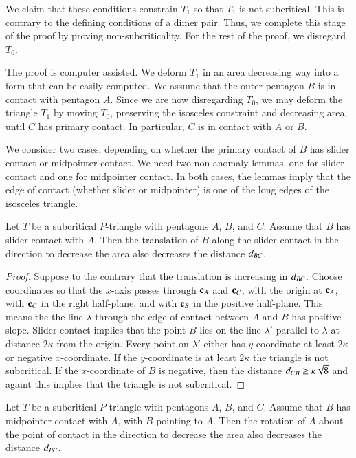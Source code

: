 We claim that these conditions constrain $T_1$ so that $T_1$ is not subcritical.  This is contrary to the defining
conditions of a dimer pair.  Thus, we complete this stage of the proof by proving non-subcriticality. For the rest of the proof, we disregard $T_0$.

The proof is computer assisted.  We deform $T_1$ in an area decreasing way into
a form that can be easily computed.  We assume that the outer pentagon $B$ is in contact with pentagon $A$.
Since we are now disregarding $T_0$, we may deform the triangle $T_1$ by moving $T_0$, preserving the isosceles constraint and decreasing area,
until $C$ has primary contact.  In particular, $C$ is in contact with $A$ or $B$.

We consider two cases, depending on whether the primary contact of  $B$ has slider contact  or midpointer contact.  
We need two non-anomaly lemmas, one for slider contact and one for midpointer contact.  In both cases, the lemmas imply that the
edge of contact (whether slider or midpointer) is one of the long edges of the isosceles triangle.

\begin{lemma}  Let $T$ be a subcritical $P$-triangle with pentagons $A$, $B$, and $C$.  Assume that $B$ has slider
contact with $A$.  Then the translation of $B$ along the slider contact in the direction to decrease the area also decreases
the distance $d_{BC}$.
\end{lemma}

\begin{proof} Suppose to the contrary that the translation is increasing in $d_{BC}$.  Choose coordinates so that the $x$-axis
passes through ${\mathbf c}_A$ and ${\mathbf c}_C$, with the origin at ${\mathbf c}_A$, with  ${\mathbf c}_C$ in the right half-plane, and with ${\mathbf c}_B$ in the positive half-plane.
This means the the line $\lambda$ through the edge
of contact between $A$ and $B$ has positive slope.  Slider contact implies that 
the point $B$ lies on the line $\lambda'$ parallel to $\lambda$ at distance $2\kappa$ from the origin.
Every point on $\lambda'$ either has $y$-coordinate at least $2\kappa$ or negative $x$-coordinate.  If the $y$-coordinate
is at least $2\kappa$ the triangle is not subcritical.  If the $x$-coordinate of $B$ is negative, then the distance $d_{CB} \ge\kappa\sqrt8$
and againt this implies that the triangle is not subcritical.
\end{proof}

\begin{lemma}  Let $T$ be a subcritical $P$-triangle with pentagons $A$, $B$, and $C$.  Assume that $B$ has midpointer
contact with $A$, with $B$ pointing to $A$.  Then the rotation of $A$ about the point of contact in the direction to decrease the area also decreases
the distance $d_{BC}$.
\end{lemma}



